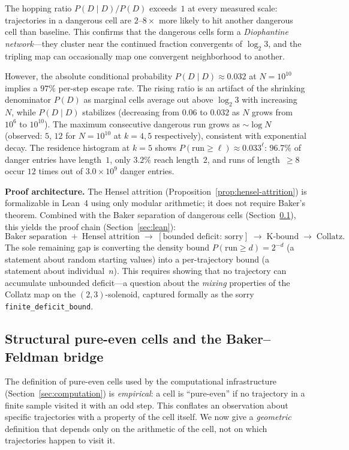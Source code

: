 \documentclass[manuscript]{aomart}
\theoremstyle{plain}
\theoremstyle{definition}
\theoremstyle{remark}
\numberwithin{equation}{section}
\begin{document}
\noindent
The hopping ratio $P(D \mid D) / P(D)$ exceeds~$1$ at every measured
scale: trajectories in a dangerous cell are $2$--$8\times$ more
likely to hit another dangerous cell than baseline.  This confirms
that the dangerous cells form a \emph{Diophantine network}---they
cluster near the continued fraction convergents of $\log_2 3$, and
the tripling map can occasionally map one convergent neighborhood
to another.

However, the absolute conditional probability $P(D \mid D) \approx 0.032$
at $N = 10^{10}$ implies a $97\%$ per-step escape rate.  The rising
ratio is an artifact of the shrinking denominator $P(D)$ as marginal
cells average out above $\log_2 3$ with increasing~$N$, while
$P(D \mid D)$ stabilizes (decreasing from $0.06$ to $0.032$ as
$N$ grows from $10^6$ to $10^{10}$).
The maximum consecutive dangerous run grows as $\sim \log N$
(observed: $5$, $12$ for $N = 10^{10}$ at $k = 4, 5$ respectively),
consistent with exponential decay.  The residence histogram at $k = 5$
shows $P(\text{run} \ge \ell) \approx 0.033^\ell$: 96.7\% of danger
entries have length~$1$, only $3.2\%$ reach length~$2$, and runs of
length~$\ge 8$ occur $12$ times out of $3.0 \times 10^9$ danger entries.

\medskip\noindent
\textbf{Proof architecture.}\enspace
The Hensel attrition (Proposition~\ref{prop:hensel-attrition}) is
formalizable in Lean~4 using only modular arithmetic; it does not
require Baker's theorem.  Combined with the Baker separation of
dangerous cells (Section~\ref{sec:tunnel-eval}), this yields the
proof chain (Section~\ref{sec:lean}):
\[
\text{Baker separation} \;+\; \text{Hensel attrition}
\;\to\; [\text{bounded deficit: sorry}]
\;\to\; \text{K-bound} \;\to\; \text{Collatz}.
\]
The sole remaining gap is converting the density bound
$P(\text{run} \ge d) = 2^{-d}$ (a statement about random starting
values) into a per-trajectory bound (a statement about individual~$n$).
This requires showing that no trajectory can accumulate unbounded
deficit---a question about the \emph{mixing} properties of the
Collatz map on the $(2,3)$-solenoid, captured formally as the sorry
\texttt{finite\_deficit\_bound}.

\subsection{Structural pure-even cells and the Baker--Feldman bridge}
\label{sec:tunnel-eval}

The definition of pure-even cells used by the computational
infrastructure (Section~\ref{sec:computation}) is \emph{empirical}:
a cell is ``pure-even'' if no trajectory in a finite sample visited it
with an odd step.  This conflates an observation about specific
trajectories with a property of the cell itself.  We now give a
\emph{geometric} definition that depends only on the arithmetic of the
cell, not on which trajectories happen to visit it.
\end{document}
